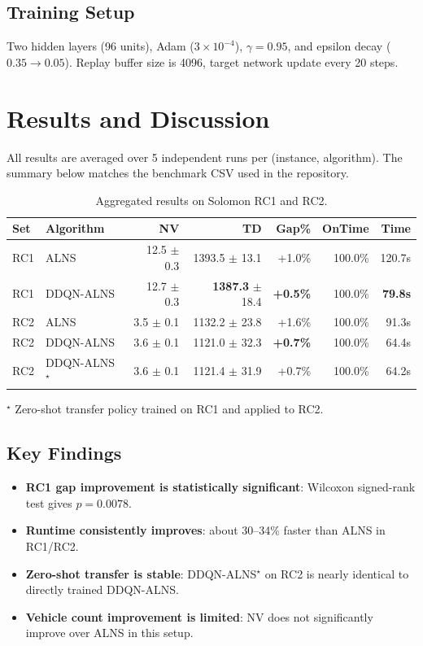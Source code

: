 \documentclass[13pt, a4paper]{extarticle}
\begin{document}
\subsection{Training Setup}
Two hidden layers (96 units), Adam ($3\times10^{-4}$), $\gamma=0.95$, and epsilon decay ($0.35\rightarrow0.05$). Replay buffer size is 4096, target network update every 20 steps.

\section{Results and Discussion}
All results are averaged over 5 independent runs per (instance, algorithm). The summary below matches the benchmark CSV used in the repository.

\begin{table}[h]
\centering
\caption{Aggregated results on Solomon RC1 and RC2.}
\label{tab:summary}
\begin{tabular}{llrrrrr}
\toprule
\textbf{Set} & \textbf{Algorithm} & \textbf{NV} & \textbf{TD} & \textbf{Gap\%} & \textbf{OnTime} & \textbf{Time} \\
\midrule
RC1 & ALNS & 12.5 $\pm$ 0.3 & 1393.5 $\pm$ 13.1 & +1.0\% & 100.0\% & 120.7s \\
RC1 & DDQN-ALNS & 12.7 $\pm$ 0.3 & \textbf{1387.3} $\pm$ 18.4 & \textbf{+0.5\%} & 100.0\% & \textbf{79.8s} \\
\midrule
RC2 & ALNS & 3.5 $\pm$ 0.1 & 1132.2 $\pm$ 23.8 & +1.6\% & 100.0\% & 91.3s \\
RC2 & DDQN-ALNS & 3.6 $\pm$ 0.1 & 1121.0 $\pm$ 32.3 & \textbf{+0.7\%} & 100.0\% & 64.4s \\
RC2 & DDQN-ALNS$^\star$ & 3.6 $\pm$ 0.1 & 1121.4 $\pm$ 31.9 & +0.7\% & 100.0\% & 64.2s \\
\bottomrule
\end{tabular}
\vspace{0.2em}
\small $^\star$ Zero-shot transfer policy trained on RC1 and applied to RC2.
\end{table}

\subsection{Key Findings}
\begin{itemize}
    \item \textbf{RC1 gap improvement is statistically significant}: Wilcoxon signed-rank test gives $p=0.0078$.
    \item \textbf{Runtime consistently improves}: about 30--34\% faster than ALNS in RC1/RC2.
    \item \textbf{Zero-shot transfer is stable}: DDQN-ALNS$^\star$ on RC2 is nearly identical to directly trained DDQN-ALNS.
    \item \textbf{Vehicle count improvement is limited}: NV does not significantly improve over ALNS in this setup.
\end{itemize}
\end{document}
